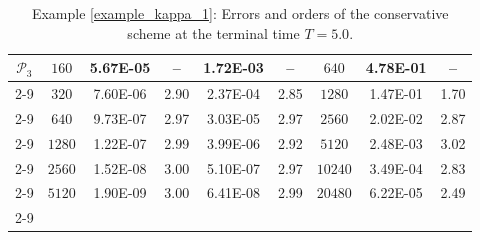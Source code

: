 \documentclass[11pt]{article}
\numberwithin{equation}{section}
\begin{document}
\begin{table}[!ht]
\begin{tabular}{|c|c|cc|cc|c|cc|}
\multirow{6}{0.6cm}{$\mathcal{P}_3$}& $  160$ &    5.67E-05&	  --  &    1.72E-03&      --    & $  640$ &    4.78E-01&      --  \\ \cline{2-9}
									& $  320$ &    7.60E-06&     2.90 &    2.37E-04&     2.85	& $ 1280$ &    1.47E-01&     1.70	 \\ \cline{2-9}
									& $  640$ &    9.73E-07&     2.97 &    3.03E-05&     2.97	& $ 2560$ &    2.02E-02&     2.87	 \\ \cline{2-9}
									& $ 1280$ &    1.22E-07&     2.99 &    3.99E-06&     2.92	& $ 5120$ &    2.48E-03&     3.02	 \\ \cline{2-9}
									& $ 2560$ &    1.52E-08&     3.00 &    5.10E-07&     2.97	& $10240$ &    3.49E-04&     2.83	 \\ \cline{2-9}
									& $ 5120$ &    1.90E-09&     3.00 &    6.41E-08&     2.99	& $20480$ &    6.22E-05&     2.49	 \\ \cline{2-9} \hline
\end{tabular}

\caption{ Example \ref{example_kappa_1}: Errors and orders of the conservative scheme at the terminal time $T=5.0$. }\label{tab_exkappa1_tab_err1}
\end{table}
\end{document}
